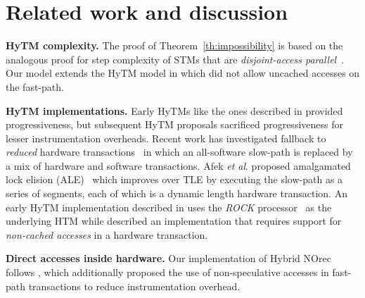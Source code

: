 \section{Related work and discussion}
\label{sec:rel}
%
\vspace{1mm}\noindent\textbf{HyTM complexity.}
The proof of Theorem~\ref{th:impossibility} is based on the analogous proof for step complexity of STMs that are \emph{disjoint-access parallel}~\cite{prog15-pact}.
Our model extends the HyTM model in \cite{hytm14disc} which did not allow uncached accesses on the fast-path.

\vspace{1mm}\noindent\textbf{HyTM implementations.}
Early HyTMs like the ones described in \cite{damronhytm, kumarhytm} provided progressiveness, but
subsequent HyTM proposals sacrificed progressiveness for lesser instrumentation overheads.
Recent work has investigated fallback to \emph{reduced} hardware transactions~\cite{MS13}
in which an all-software slow-path is replaced by a mix of hardware and software transactions. 
Afek \emph{et al}. proposed amalgamated lock elision (ALE)~\cite{ale15} which improves over TLE
by executing the slow-path as a series of segments, each of which is a dynamic length hardware transaction.
An early HyTM implementation described in \cite{damronhytm} uses the \emph{ROCK} processor~\cite{rock} as the underlying HTM
while \cite{kumarhytm} described an implementation that requires support for \emph{non-cached accesses} in a hardware transaction. 

\vspace{1mm}\noindent\textbf{Direct accesses inside hardware.}
Our implementation of Hybrid NOrec follows \cite{hynorecriegel}, which additionally proposed the use of non-speculative accesses
in fast-path transactions to reduce instrumentation overhead. %

